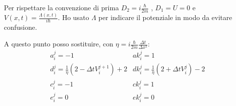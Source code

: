 \documentclass[]{article}
\newcommand{\lr}[3]{\ensuremath{\left#1 #3 \right#2}}
\newcommand{\lrt}[1]{\lr{(}{)}{#1}}
\numberwithin{equation}{subsection}
\begin{document}
Per rispettare la convenzione di prima $D_2 = i\frac{\hbar}{2m}$ , $D_1 = U = 0$ e $V(x,t) = \frac{\varLambda(x,t)}{i\hbar}$. Ho usato $\varLambda$ per indicare il potenziale in modo da evitare confusione.


A questo punto posso sostituire, con $\eta = i\frac{\hbar}{2m}\frac{\Delta t}{\Delta x^2}$:
\begin{equation}\label{eq:pararametriSC}
\begin{array}{ll}
a_i^j = -1            & ak_i^j =1\\
d_i^j = \frac1\eta\lrt{2-\Delta t V_i^{j+1}} +2 & dk_i^j = \frac1\eta\lrt{2+\Delta tV_i^{j}} -2 \\
c_i^j = -1             & ck_i^j =1\\
e_i^j = 0             & ek_i^j =0
\end{array}
\end{equation}
\end{document}
